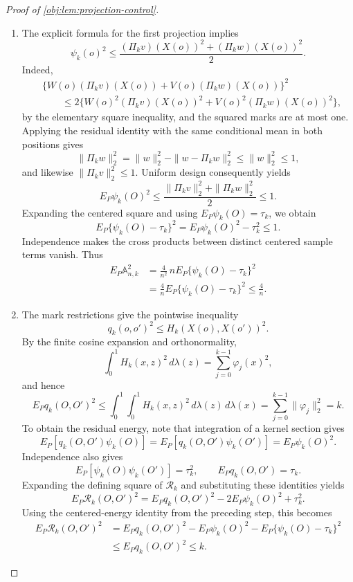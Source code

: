 \documentclass[11pt]{article}
\begin{document}
\begin{proof}[Proof of \cref{obj:lem:projection-control}]
\begin{enumerate}
\item The explicit formula for the first projection implies
\[
\psi_k(o)^2
\le\frac{(\Pi_kv)(X(o))^2+(\Pi_kw)(X(o))^2}{2}.
\]
Indeed,
\[
\begin{aligned}
&\{W(o)(\Pi_kv)(X(o))+V(o)(\Pi_kw)(X(o))\}^2\\
&\qquad\le2\{W(o)^2(\Pi_kv)(X(o))^2
             +V(o)^2(\Pi_kw)(X(o))^2\},
\end{aligned}
\]
by the elementary square inequality, and the squared marks are at most one. Applying the residual identity with the same conditional mean in both positions gives
\[
\|\Pi_kw\|_2^2
=\|w\|_2^2-\|w-\Pi_kw\|_2^2
\le\|w\|_2^2\le1,
\]
and likewise \(\|\Pi_kv\|_2^2\le1\). Uniform design consequently yields
\[
E_P\psi_k(O)^2
\le\frac{\|\Pi_kv\|_2^2+\|\Pi_kw\|_2^2}{2}\le1.
\]
Expanding the centered square and using \(E_P\psi_k(O)=\tau_k\), we obtain
\[
E_P\{\psi_k(O)-\tau_k\}^2
=E_P\psi_k(O)^2-\tau_k^2\le1.
\]
Independence makes the cross products between distinct centered sample terms vanish. Thus
\[
\begin{aligned}
E_P\mathbb A_{n,k}^2
&=\frac4{n^2}\,
 nE_P\{\psi_k(O)-\tau_k\}^2\\
&=\frac4nE_P\{\psi_k(O)-\tau_k\}^2
\le\frac4n.
\end{aligned}
\]

\item The mark restrictions give the pointwise inequality
\[
q_k(o,o')^2\le H_k(X(o),X(o'))^2.
\]
By the finite cosine expansion and orthonormality,
\[
\int_0^1 H_k(x,z)^2\,d\lambda(z)
=\sum_{j=0}^{k-1}\varphi_j(x)^2,
\]
and hence
\[
E_Pq_k(O,O')^2
\le\int_0^1\!\int_0^1H_k(x,z)^2\,d\lambda(z)\,d\lambda(x)
=\sum_{j=0}^{k-1}\|\varphi_j\|_2^2=k.
\]
To obtain the residual energy, note that integration of a kernel section gives
\[
E_P[q_k(O,O')\psi_k(O)]
=E_P[q_k(O,O')\psi_k(O')]
=E_P\psi_k(O)^2.
\]
Independence also gives
\[
E_P[\psi_k(O)\psi_k(O')]=\tau_k^2,
\qquad
E_Pq_k(O,O')=\tau_k.
\]
Expanding the defining square of \(\mathcal R_k\) and substituting these identities yields
\[
E_P\mathcal R_k(O,O')^2
=E_Pq_k(O,O')^2-2E_P\psi_k(O)^2+\tau_k^2.
\]
Using the centered-energy identity from the preceding step, this becomes
\[
\begin{aligned}
E_P\mathcal R_k(O,O')^2
&=E_Pq_k(O,O')^2-E_P\psi_k(O)^2
  -E_P\{\psi_k(O)-\tau_k\}^2\\
&\le E_Pq_k(O,O')^2\le k.
\end{aligned}
\]


\end{enumerate}
\end{proof}
\end{document}
